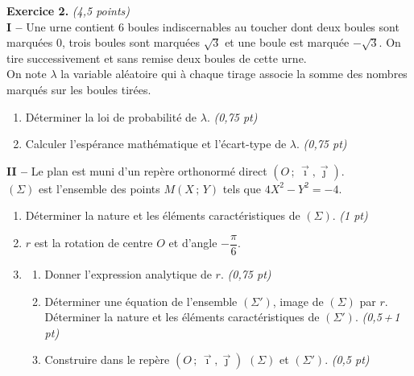 \smallskip
\noindent\textbf{Exercice 2.} \hfill\textit{(4,5 points)}\\[2pt]
\noindent\textbf{I -- } Une urne contient $6$ boules indiscernables au toucher dont deux boules sont marquées $0$, trois boules sont marquées $\sqrt3$ et une boule est marquée $-\sqrt3$. On tire successivement et sans remise deux boules de cette urne.\\
On note $\lambda$ la variable aléatoire qui à chaque tirage associe la somme des nombres marqués sur les boules tirées.
\begin{enumerate}[label=\arabic*)]
\item Déterminer la loi de probabilité de $\lambda$. \hfill\textit{(0,75 pt)}
\item Calculer l'espérance mathématique et l'écart-type de $\lambda$. \hfill\textit{(0,75 pt)}
\end{enumerate}
\noindent\textbf{II -- } Le plan est muni d'un repère orthonormé direct $(O\,;\,\vec\imath,\vec\jmath)$.\\
$(\Sigma)$ est l'ensemble des points $M(X\,;\,Y)$ tels que $4X^2-Y^2=-4$.
\begin{enumerate}[label=\arabic*)]
\item Déterminer la nature et les éléments caractéristiques de $(\Sigma)$. \hfill\textit{(1 pt)}
\item[] $r$ est la rotation de centre $O$ et d'angle $-\dfrac{\pi}{6}$.
\item[2.] \begin{enumerate}[label=\alph*)]
  \item Donner l'expression analytique de $r$. \hfill\textit{(0,75 pt)}
  \item Déterminer une équation de l'ensemble $(\Sigma')$, image de $(\Sigma)$ par $r$. Déterminer la nature et les éléments caractéristiques de $(\Sigma')$. \hfill\textit{(0,5\,+\,1 pt)}
  \item Construire dans le repère $(O\,;\,\vec\imath,\vec\jmath)$ $(\Sigma)$ et $(\Sigma')$. \hfill\textit{(0,5 pt)}
  \end{enumerate}
\end{enumerate}

